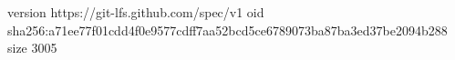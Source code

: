 version https://git-lfs.github.com/spec/v1
oid sha256:a71ee77f01cdd4f0e9577cdff7aa52bcd5ce6789073ba87ba3ed37be2094b288
size 3005
